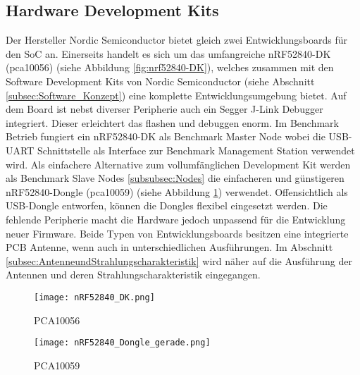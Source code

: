 \subsection{Hardware Development Kits}\label{subsec:HardwareDevelopmentKits}
Der Hersteller Nordic Semiconductor bietet gleich zwei Entwicklungsboards für den SoC an.
Einerseits handelt es sich um das umfangreiche nRF52840-DK (pca10056) (siehe Abbildung \ref{fig:nrf52840-DK}), welches zusammen mit den Software Development Kits von Nordic Semiconductor (siehe Abschnitt \ref{subsec:Software_Konzept}) eine komplette Entwicklungsumgebung bietet.
Auf dem Board ist nebst diverser Peripherie auch ein Segger J-Link Debugger integriert.
Dieser erleichtert das flashen und debuggen enorm.
Im Benchmark Betrieb fungiert ein nRF52840-DK als Benchmark Master Node wobei die USB-UART Schnittstelle als Interface zur Benchmark Management Station verwendet wird.
Als einfachere Alternative zum vollumfänglichen Development Kit werden als Benchmark Slave Nodes \ref{subsubsec:Nodes} die einfacheren und günstigeren nRF52840-Dongle (pca10059) (siehe Abbildung \ref{fig:nrf52840-Dongle}) verwendet.
Offensichtlich als USB-Dongle entworfen, können die Dongles flexibel eingesetzt werden. Die fehlende Peripherie macht die Hardware jedoch unpassend für die Entwicklung neuer Firmware.
Beide Typen von Entwicklungsboards besitzen eine integrierte PCB Antenne, wenn auch in unterschiedlichen Ausführungen.
Im Abschnitt \ref{subsec:AntenneundStrahlungscharakteristik} wird näher auf die Ausführung der Antennen und deren Strahlungscharakteristik eingegangen.


\begin{figure}[!htbp]
\centering
\begin{minipage}[b]{0.49\textwidth}
		\centering
		\texttt{[image: nRF52840\_DK.png]}
		\caption[nRF52840-DK PCA10056]{PCA10056 \cite{nordic_semiconductor_asa_nrf52840_2020-1}}
		\label{fig:nrf52840-DK}
\end{minipage}
\begin{minipage}[b]{0.49\textwidth}
		\centering
		\texttt{[image: nRF52840\_Dongle\_gerade.png]}
		\caption[nRF52840-Dongle PCA10059]{PCA10059 \cite{nordic_semiconductor_asa_nrf52840_2020-2}}
		\label{fig:nrf52840-Dongle}
\end{minipage}
\end{figure}



